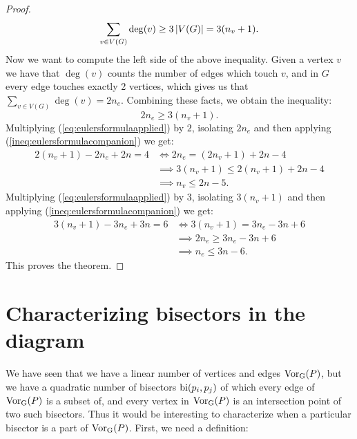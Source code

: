 \begin{proof}
\[
    \sum_{v \in V(G)} \deg(v) \geq 3 \left\lvert V(G) \right\rvert = 3(n_v + 1).
\]
Now we want to compute the left side of the above inequality. Given a vertex $v$ we have that $\deg(v)$ counts the number of edges which touch $v$, and in $G$ every edge touches exactly 2 vertices, which gives us that $\sum_{v \in V(G)} \deg(v) = 2 n_e$. Combining these facts, we obtain the inequality:
\begin{equation} \label{ineq:eulersformulacompanion}
    2 n_e \geq 3(n_v + 1).
\end{equation}
Multiplying (\ref{eq:eulersformulaapplied}) by $2$, isolating $2 n_e$ and then applying (\ref{ineq:eulersformulacompanion}) we get:
\begin{align*}
    2 (n_v + 1) - 2 n_e + 2 n = 4
    &\iff 2 n_e = (2 n_v + 1) + 2n - 4 \\
    &\implies 3(n_v + 1) \leq 2 (n_v + 1) + 2n - 4 \\
    &\implies n_v \leq 2n - 5.
\end{align*}
Multiplying (\ref{eq:eulersformulaapplied}) by $3$, isolating $3 (n_v + 1)$ and then applying (\ref{ineq:eulersformulacompanion}) we get:
\begin{align*}
    3 (n_v + 1) - 3 n_e + 3 n = 6
    &\iff 3 (n_v + 1) = 3 n_e - 3n + 6 \\
    &\implies 2 n_e \geq 3n_e - 3n + 6 \\
    &\implies n_e \leq 3n - 6.
\end{align*}
This proves the theorem.
\end{proof}

\section{Characterizing bisectors in the diagram}
We have seen that we have a linear number of vertices and edges $\operatorname{Vor_{G}}(P)$, but we have a quadratic number of bisectors $\operatorname{bi}(p_i, p_j)$ of which every edge of $\operatorname{Vor_{G}}(P)$ is a subset of, and every vertex in $\operatorname{Vor_{G}}(P)$ is an intersection point of two such bisectors. Thus it would be interesting to characterize when a particular bisector is a part of $\operatorname{Vor_{G}}(P)$. First, we need a definition:

